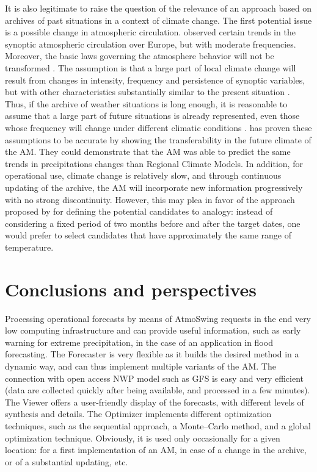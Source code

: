 \documentclass[review]{elsarticle}
\begin{document}
It is also legitimate to raise the question of the relevance of an approach based on archives of past situations in a context of climate change. The first potential issue is a possible change in atmospheric circulation. \citet{Philipp2007} observed certain trends in the synoptic atmospheric circulation over Europe, but with moderate frequencies. Moreover, the basic laws governing the atmosphere behavior will not be transformed \citep{Hewitson1996}. The assumption is that a large part of local climate change will result from changes in intensity, frequency and persistence of synoptic variables, but with other characteristics substantially similar to the present situation \citep{Hewitson1996}. Thus, if the archive of weather situations is long enough, it is reasonable to assume that a large part of future situations is already represented, even those whose frequency will change under different climatic conditions \citep{Wetterhall2005}. \citet{Dayon2015} has proven these assumptions to be accurate by showing the transferability in the future climate of the AM. They could demonstrate that the AM was able to predict the same trends in precipitations changes than Regional Climate Models. In addition, for operational use, climate change is relatively slow, and through continuous updating of the archive, the AM will incorporate new information progressively with no strong discontinuity. However, this may plea in favor of the approach proposed by \cite{BenDaoud2010} for defining the potential candidates to analogy: instead of considering a fixed period of two months before and after the target dates, one would prefer to select candidates that have approximately the same range of temperature.


\section{Conclusions and perspectives}
\label{sec:conclusions}

Processing operational forecasts by means of AtmoSwing requests in the end very low computing infrastructure and can provide useful information, such as early warning for extreme precipitation, in the case of an application in flood forecasting. The Forecaster is very flexible as it builds the desired method in a dynamic way, and can thus implement multiple variants of the AM. The connection with open access NWP model such as GFS is easy and very efficient (data are collected quickly after being available, and processed in a few minutes). The Viewer offers a user-friendly display of the forecasts, with different levels of synthesis and details. The Optimizer implements different optimization techniques, such as the sequential approach, a Monte--Carlo method, and a global optimization technique. Obviously, it is used only occasionally for a given location: for a first implementation of an AM, in case of a change in the archive, or of a substantial updating, etc.
\end{document}
